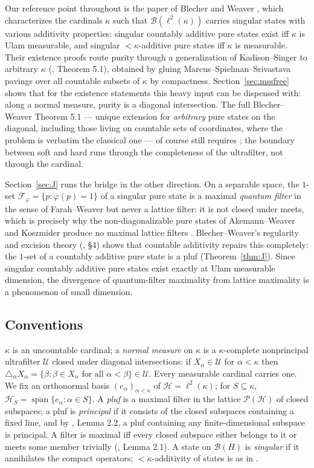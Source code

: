 \documentclass[11pt,reqno]{amsart}
\theoremstyle{definition}
\newcommand{\HH}{\mathcal{H}}
\newcommand{\PP}{\mathcal{P}}
\newcommand{\U}{\mathcal{U}}
\newcommand{\FF}{\mathcal{F}}
\newcommand{\lk}{\ell^2(\kappa)}
\newcommand{\Blk}{\mathcal{B}(\ell^2(\kappa))}
\begin{document}
Our reference point throughout is the paper of Blecher and Weaver
\cite{BlecherWeaver}, which characterizes the cardinals $\kappa$ such that $\Blk$
carries singular states with various additivity properties: singular countably additive
pure states exist iff $\kappa$ is Ulam measurable, and singular $<\kappa$-additive pure
states iff $\kappa$ is measurable. Their existence proofs route purity through a
generalization of Kadison--Singer to arbitrary $\kappa$ (\cite{BlecherWeaver}, Theorem
5.1), obtained by gluing Marcus--Spielman--Srivastava pavings over all countable subsets
of $\kappa$ by compactness. Section~\ref{sec:mssfree} shows that for the existence
statements this heavy input can be dispensed with: along a normal measure, purity is a
diagonal intersection. The full Blecher--Weaver Theorem 5.1 --- unique extension for
\emph{arbitrary} pure states on the diagonal, including those living on countable sets
of coordinates, where the problem is verbatim the classical one --- of course still
requires \cite{MSS}; the boundary between soft and hard runs through the completeness
of the ultrafilter, not through the cardinal.

Section~\ref{sec:J} runs the bridge in the other direction. On a separable space, the
$1$-set $\FF_\varphi=\{p:\varphi(p)=1\}$ of a singular pure state is a maximal
\emph{quantum filter} in the sense of Farah--Weaver \cite{FarahWofsey} but never a
lattice filter: it is not closed under meets, which is precisely why the
non-diagonalizable pure states of Akemann--Weaver and Koszmider produce no maximal
lattice filters \cite{FWI}. Blecher--Weaver's regularity and excision theory
(\cite{BlecherWeaver}, \S4) shows that countable additivity repairs this completely:
the $1$-set of a countably additive pure state is a pluf (Theorem~\ref{thm:J}). Since
singular countably additive pure states exist exactly at Ulam measurable dimension, the
divergence of quantum-filter maximality from lattice maximality is a phenomenon of
small dimension.

\subsection*{Conventions}
$\kappa$ is an uncountable cardinal; a \emph{normal measure} on $\kappa$ is a
$\kappa$-complete nonprincipal ultrafilter $\U$ closed under diagonal intersections:
if $X_\alpha\in\U$ for $\alpha<\kappa$ then
$\triangle_\alpha X_\alpha=\{\beta:\beta\in X_\alpha\text{ for all }\alpha<\beta\}
\in\U$. Every measurable cardinal carries one. We fix an orthonormal basis
$(e_\alpha)_{\alpha<\kappa}$ of $\HH=\lk$; for $S\subseteq\kappa$,
$\HH_S=\overline{\operatorname{span}}\{e_\alpha:\alpha\in S\}$. A \emph{pluf} is a
maximal filter in the lattice $\PP(\HH)$ of closed subspaces; a pluf is
\emph{principal} if it consists of the closed subspaces containing a fixed line, and by
\cite{FWI}, Lemma 2.2, a pluf containing any finite-dimensional subspace is principal.
A filter is maximal iff every closed subspace either belongs to it or meets some member
trivially (\cite{FWI}, Lemma 2.1). A state on $\mathcal B(H)$ is \emph{singular} if it
annihilates the compact operators; $<\kappa$-additivity of states is as in
\cite{BlecherWeaver}.
\end{document}
